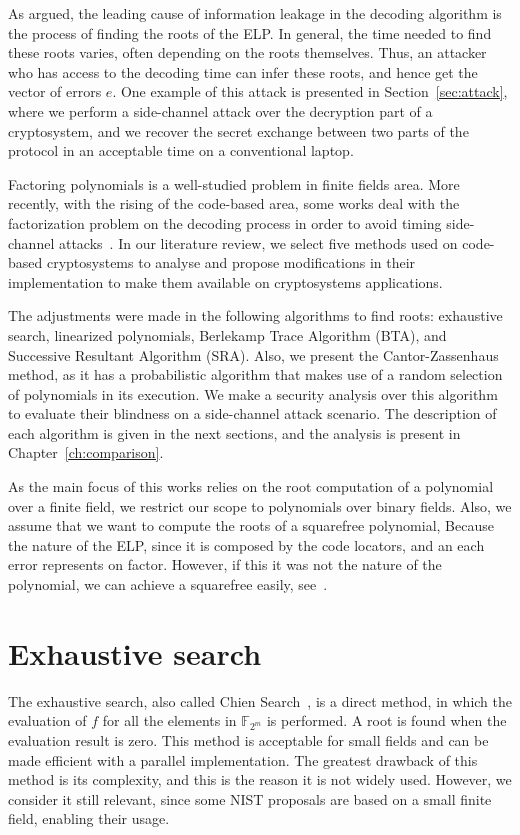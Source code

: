 As argued, the leading cause of information leakage in the decoding algorithm is the process of finding the roots of the ELP. In general, the time needed to find these roots varies, often depending on the roots themselves. Thus, an attacker who has access to the decoding time can infer these roots, and hence get the vector of errors $e$. One example of this attack is presented in Section~\ref{sec:attack}, where we perform a side-channel attack over the decryption part of a cryptosystem, and we recover the secret exchange between two parts of the protocol in an acceptable time on a conventional laptop.

Factoring polynomials is a well-studied problem in finite fields area. More recently, with the rising of the code-based area, some works deal with the factorization problem on the decoding process in order to avoid timing side-channel attacks~\cite{shoufan2009timing, bucerzan2017improved}. In our literature review, we select five methods used on code-based cryptosystems to analyse and propose modifications in their implementation to make them available on cryptosystems applications.

The adjustments were made in the following algorithms to find roots: exhaustive search, linearized polynomials, Berlekamp Trace Algorithm (BTA), and Successive Resultant Algorithm (SRA). Also, we present the Cantor-Zassenhaus method, as it has a probabilistic algorithm that makes use of a random selection of polynomials in its execution. We make a security analysis over this algorithm to evaluate their blindness on a side-channel attack scenario. The description of each algorithm is given in the next sections, and the analysis is present in Chapter~\ref{ch:comparison}.

As the main focus of this works relies on the root computation of a polynomial over a finite field, we restrict our scope to polynomials over binary fields. Also, we assume that we want to compute the roots of a squarefree polynomial, Because the nature of the ELP, since it is composed by the code locators, and an each error represents on factor. However, if this it was not the nature of the polynomial, we can achieve a squarefree easily, see~\cite{von2001factoring}.

\section{Exhaustive search}
The exhaustive search, also called Chien Search~\cite{chien1964cyclic}, is a direct method, in which the evaluation of $f$ for all the elements in $\mathbb{F}_{2^m}$ is performed. A root is found when the evaluation result is zero. This method is acceptable for small fields and can be made efficient with a parallel implementation. The greatest drawback of this method is its complexity, and this is the reason it is not widely used. However, we consider it still relevant, since some NIST proposals are based on a small finite field, enabling their usage. 

